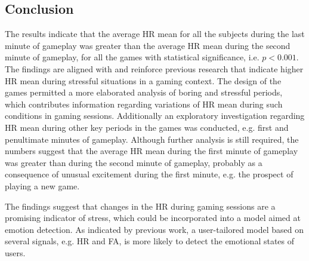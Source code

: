 
\subsection{Conclusion}

The results indicate that the average HR mean for all the subjects during the last minute of gameplay was greater than the average HR mean during the second minute of gameplay, for all the games with statistical significance, i.e. $p<0.001$. The findings are aligned with and reinforce previous research that indicate higher HR mean during stressful situations in a gaming context. The design of the games permitted a more elaborated analysis of boring and stressful periods, which contributes information regarding variations of HR mean during such conditions in gaming sessions. Additionally an exploratory investigation regarding HR mean during other key periods in the games was conducted, e.g. first and penultimate minutes of gameplay. Although further analysis is still required, the numbers suggest that the average HR mean during the first minute of gameplay was greater than during the second minute of gameplay, probably as a consequence of unusual excitement during the first minute, e.g. the prospect of playing a new game.

The findings suggest that changes in the HR during gaming sessions are a promising indicator of stress, which could be incorporated into a model aimed at emotion detection. As indicated by previous work, a user-tailored model based on several signals, e.g. HR and FA, is more likely to detect the emotional states of users.
